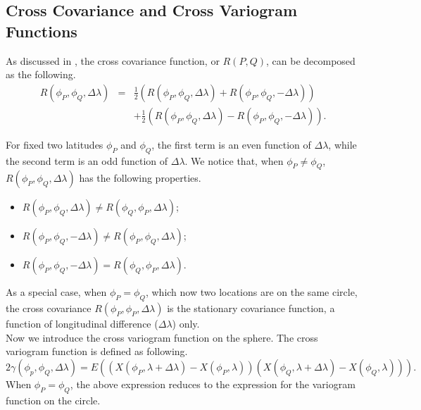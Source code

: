 \vskip 24pt 

\subsection{Cross Covariance and Cross Variogram Functions}

As discussed in \cite{Wackernagel2013}, the cross covariance function, or $R(P, Q)$, can be decomposed as the following.
\begin{eqnarray*}
R(\phi_P, \phi_Q, \Delta \lambda) &=& \frac{1}{2}(R(\phi_P, \phi_Q, \Delta \lambda) + R(\phi_P, \phi_Q, -\Delta \lambda)) \\
& & + \frac{1}{2}(R(\phi_P, \phi_Q, \Delta \lambda) - R(\phi_P, \phi_Q, -\Delta \lambda)).
\end{eqnarray*}

For fixed two latitudes $\phi_P$ and $\phi_Q$, the first term is an even function of $\Delta \lambda$, while the second term is an odd function of $\Delta \lambda$. We notice that, when $\phi_P \ne \phi_Q$, $R(\phi_P, \phi_Q, \Delta \lambda)$ has the following properties.
\begin{itemize}
\item $R(\phi_P, \phi_Q, \Delta \lambda) \ne R(\phi_Q, \phi_P, \Delta \lambda)$;
\item $R(\phi_P, \phi_Q, -\Delta \lambda) \ne R(\phi_P, \phi_Q, \Delta \lambda)$;
\item $R(\phi_P, \phi_Q, -\Delta \lambda) = R(\phi_Q, \phi_P, \Delta \lambda)$.
\end{itemize}

As a special case, when $\phi_P = \phi_Q$, which now two locations are on the same circle, the cross covariance $R(\phi_P, \phi_P, \Delta\lambda)$ is the stationary covariance function, a function of longitudinal difference ($\Delta\lambda$) only. \\

Now we introduce the cross variogram function on the sphere. The cross variogram function is defined as following.
\[
2\gamma(\phi_p, \phi_Q, \Delta\lambda) = E\left((X(\phi_P, \lambda+\Delta \lambda) - X(\phi_P, \lambda))(X(\phi_Q, \lambda+\Delta \lambda) - X(\phi_Q, \lambda))\right).
\]
When $\phi_P = \phi_Q$, the above expression reduces to the expression for the variogram function on the circle.

